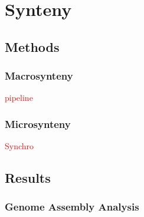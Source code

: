 \section{Synteny}

\subsection{Methods}

\subsubsection{Macrosynteny}
\textcolor{red}{pipeline}

\subsubsection{Microsynteny}
\textcolor{red}{Synchro}

\subsection{Results}

\subsubsection{Genome Assembly Analysis}

